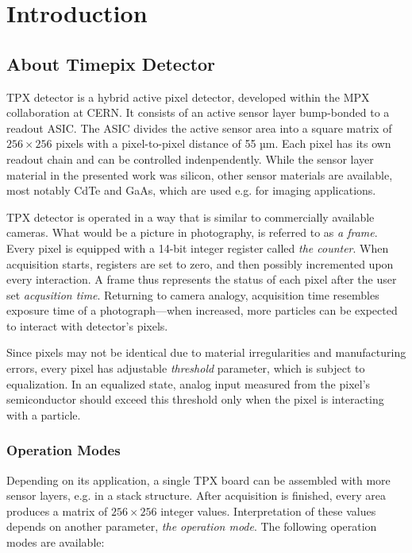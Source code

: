 \chapter{Introduction}

\section{About Timepix Detector}
TPX detector \cite{Timepix} is a hybrid active pixel detector, developed within the MPX collaboration at CERN. It consists of an active sensor layer bump-bonded to a readout ASIC. The ASIC divides the active sensor area into a square matrix of $256 \times 256$ pixels with a pixel-to-pixel distance of 55 µm. Each pixel has its own readout chain and can be controlled indenpendently. While the sensor layer material in the presented work was silicon, other sensor materials are available, most notably CdTe and GaAs, which are used e.g. for imaging applications.

TPX detector is operated in a way that is similar to commercially available cameras. What would be a picture in photography, is referred to as \textit{a frame}. Every pixel is equipped with a 14-bit integer register called \textit{the counter}. When acquisition starts, registers are set to zero, and then possibly incremented upon every interaction. A frame thus represents the status of each pixel after the user set \textit{acqusition time}. Returning to camera analogy, acquisition time resembles exposure time of a photograph---when increased, more particles can be expected to interact with detector's pixels.

Since pixels may not be identical due to material irregularities and manufacturing errors, every pixel has adjustable \textit{threshold} parameter, which is subject to equalization. In an equalized state, analog input measured from the pixel's semiconductor should exceed this threshold only when the pixel is interacting with a particle.

\subsection{Operation Modes}
Depending on its application, a single TPX board can be assembled with more sensor layers, e.g. in a stack structure. After acquisition is finished, every area produces a matrix of $256\times 256$ integer values. Interpretation of these values depends on another parameter, \textit{the operation mode}. The following operation modes are available:

